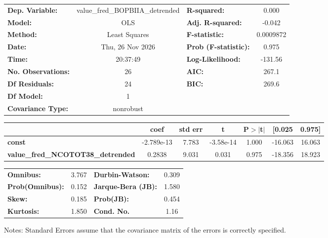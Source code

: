 \begin{center}
\begin{tabular}{lclc}
\toprule
\textbf{Dep. Variable:}                   & value\_fred\_BOPBIIA\_detrended & \textbf{  R-squared:         } &     0.000   \\
\textbf{Model:}                           &               OLS               & \textbf{  Adj. R-squared:    } &    -0.042   \\
\textbf{Method:}                          &          Least Squares          & \textbf{  F-statistic:       } & 0.0009872   \\
\textbf{Date:}                            &         Thu, 26 Nov 2026        & \textbf{  Prob (F-statistic):} &    0.975    \\
\textbf{Time:}                            &             20:37:49            & \textbf{  Log-Likelihood:    } &   -131.56   \\
\textbf{No. Observations:}                &                  26             & \textbf{  AIC:               } &     267.1   \\
\textbf{Df Residuals:}                    &                  24             & \textbf{  BIC:               } &     269.6   \\
\textbf{Df Model:}                        &                   1             & \textbf{                     } &             \\
\textbf{Covariance Type:}                 &            nonrobust            & \textbf{                     } &             \\
\bottomrule
\end{tabular}
\begin{tabular}{lcccccc}
                                          & \textbf{coef} & \textbf{std err} & \textbf{t} & \textbf{P$> |$t$|$} & \textbf{[0.025} & \textbf{0.975]}  \\
\midrule
\textbf{const}                            &   -2.789e-13  &        7.783     & -3.58e-14  &         1.000        &      -16.063    &       16.063     \\
\textbf{value\_fred\_NCOTOT38\_detrended} &       0.2838  &        9.031     &     0.031  &         0.975        &      -18.356    &       18.923     \\
\bottomrule
\end{tabular}
\begin{tabular}{lclc}
\textbf{Omnibus:}       &  3.767 & \textbf{  Durbin-Watson:     } &    0.309  \\
\textbf{Prob(Omnibus):} &  0.152 & \textbf{  Jarque-Bera (JB):  } &    1.580  \\
\textbf{Skew:}          &  0.185 & \textbf{  Prob(JB):          } &    0.454  \\
\textbf{Kurtosis:}      &  1.850 & \textbf{  Cond. No.          } &     1.16  \\
\bottomrule
\end{tabular}
\end{center}

Notes: \newline
 [1] Standard Errors assume that the covariance matrix of the errors is correctly specified.
